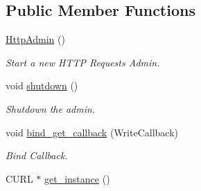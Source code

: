 \subsection*{Public Member Functions}
\begin{DoxyCompactItemize}
\item 
\hypertarget{classHttpAdmin_ad5821eb1e159cfad6e9e0676b8d1bd8d}{\hyperlink{classHttpAdmin_ad5821eb1e159cfad6e9e0676b8d1bd8d}{Http\-Admin} ()}\label{classHttpAdmin_ad5821eb1e159cfad6e9e0676b8d1bd8d}

\begin{DoxyCompactList}\small\item\em Start a new H\-T\-T\-P Requests Admin. \end{DoxyCompactList}\item 
\hypertarget{classHttpAdmin_acebe3cde5a43db8dd67fa47b71c37996}{void \hyperlink{classHttpAdmin_acebe3cde5a43db8dd67fa47b71c37996}{shutdown} ()}\label{classHttpAdmin_acebe3cde5a43db8dd67fa47b71c37996}

\begin{DoxyCompactList}\small\item\em Shutdown the admin. \end{DoxyCompactList}\item 
\hypertarget{classHttpAdmin_a8342985fecdaffdf72ee3a6f767236a7}{void \hyperlink{classHttpAdmin_a8342985fecdaffdf72ee3a6f767236a7}{bind\-\_\-get\-\_\-callback} (Write\-Callback)}\label{classHttpAdmin_a8342985fecdaffdf72ee3a6f767236a7}

\begin{DoxyCompactList}\small\item\em Bind Callback. \end{DoxyCompactList}\item 
\hypertarget{classHttpAdmin_abb47ebccfb59e2f11dac994d5c44fe7e}{C\-U\-R\-L $\ast$ \hyperlink{classHttpAdmin_abb47ebccfb59e2f11dac994d5c44fe7e}{get\-\_\-instance} ()}\label{classHttpAdmin_abb47ebccfb59e2f11dac994d5c44fe7e}


\end{DoxyCompactItemize}
